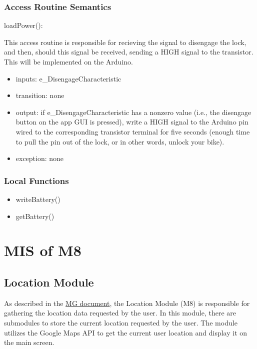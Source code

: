 \documentclass[12pt, titlepage]{article}
\begin{document}
\subsubsection{Access Routine Semantics}

\noindent loadPower():

This access routine is responsible for recieving the signal to disengage the lock, and then, should this signal be received, sending a HIGH signal to the transistor. This will be implemented on the Arduino. 

\begin{itemize}
\item inputs: e\_DisengageCharacteristic
\item transition: none 
\item output: if e\_DisengageCharacteristic has a nonzero value (i.e., the disengage button on the app GUI is pressed), write a HIGH signal to the Arduino pin wired to the corresponding transistor terminal for five seconds (enough time to pull the pin out of the lock, or in other words, unlock your bike). 
\item exception: none 
\end{itemize}

\subsubsection{Local Functions}

\begin{itemize}
\item writeBattery()
\item getBattery()
\end{itemize}

\section{MIS of M8} \label{Location} 

\subsection{Location Module}

As described in the \href{https://github.com/NevoAbigail/Capstone/blob/main/docs/Design/SoftArchitecture/MG.pdf}{MG document}, the Location Module (M8) is responsible for gathering the location data requested by the user. In this module, there are submodules to store the current location requested by the user. The module utilizes the Google Maps API to get the current user location and display it on the main screen. 
\end{document}
